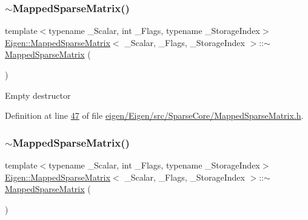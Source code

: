 \subsubsection{\texorpdfstring{$\sim$\+Mapped\+Sparse\+Matrix()}{~MappedSparseMatrix()}\hspace{0.1cm}{\footnotesize\ttfamily [1/2]}}
{\footnotesize\ttfamily template$<$typename \+\_\+\+Scalar, int \+\_\+\+Flags, typename \+\_\+\+Storage\+Index$>$ \\
\hyperlink{class_eigen_1_1_mapped_sparse_matrix}{Eigen\+::\+Mapped\+Sparse\+Matrix}$<$ \+\_\+\+Scalar, \+\_\+\+Flags, \+\_\+\+Storage\+Index $>$\+::$\sim$\hyperlink{class_eigen_1_1_mapped_sparse_matrix}{Mapped\+Sparse\+Matrix} (\begin{DoxyParamCaption}{ }\end{DoxyParamCaption})\hspace{0.3cm}{\ttfamily [inline]}}

Empty destructor 

Definition at line \hyperlink{eigen_2_eigen_2src_2_sparse_core_2_mapped_sparse_matrix_8h_source_l00047}{47} of file \hyperlink{eigen_2_eigen_2src_2_sparse_core_2_mapped_sparse_matrix_8h_source}{eigen/\+Eigen/src/\+Sparse\+Core/\+Mapped\+Sparse\+Matrix.\+h}.

\mbox{\label{class_eigen_1_1_mapped_sparse_matrix_a0c36a53853f1659ea59447bcb9a20799}} 
\subsubsection{\texorpdfstring{$\sim$\+Mapped\+Sparse\+Matrix()}{~MappedSparseMatrix()}\hspace{0.1cm}{\footnotesize\ttfamily [2/2]}}
{\footnotesize\ttfamily template$<$typename \+\_\+\+Scalar, int \+\_\+\+Flags, typename \+\_\+\+Storage\+Index$>$ \\
\hyperlink{class_eigen_1_1_mapped_sparse_matrix}{Eigen\+::\+Mapped\+Sparse\+Matrix}$<$ \+\_\+\+Scalar, \+\_\+\+Flags, \+\_\+\+Storage\+Index $>$\+::$\sim$\hyperlink{class_eigen_1_1_mapped_sparse_matrix}{Mapped\+Sparse\+Matrix} (\begin{DoxyParamCaption}{ }\end{DoxyParamCaption})\hspace{0.3cm}{\ttfamily [inline]}}

